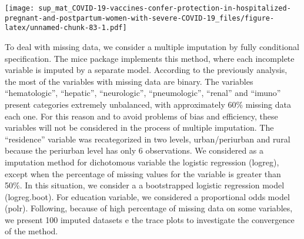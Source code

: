 \documentclass[
]{article}
\begin{document}
\texttt{[image: sup\_mat\_COVID-19-vaccines-confer-protection-in-hospitalized-pregnant-and-postpartum-women-with-severe-COVID-19\_files/figure-latex/unnamed-chunk-83-1.pdf]}

To deal with missing data, we consider a multiple imputation by fully
conditional specification. The mice package implements this method,
where each incomplete variable is imputed by a separate model. According
to the previously analysis, the most of the variables with missing data
are binary. The variables ``hematologic'', ``hepatic'', ``neurologic'',
``pneumologic'', ``renal'' and ``imuno'' present categories extremely
unbalanced, with approximately 60\% missing data each one. For this
reason and to avoid problems of bias and efficiency, these variables
will not be considered in the process of multiple imputation. The
``residence'' variable was recategorized in two levels, urban/periurban
and rural because the periurban level has only 6 observations. We
considered as a imputation method for dichotomous variable the logistic
regression (logreg), except when the percentage of missing values for
the variable is greater than 50\%. In this situation, we consider a a
bootstrapped logistic regression model (logreg.boot). For education
variable, we considered a proportional odds model (polr). Following,
because of high percentage of missing data on some variables, we present
100 imputed datasets e the trace plots to investigate the convergence of
the method.
\end{document}
